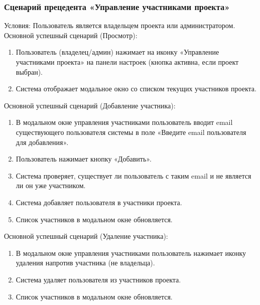 \subsubsection{Сценарий прецедента «Управление участниками проекта»}
Условия: Пользователь является владельцем проекта или администратором.
Основной успешный сценарий (Просмотр):
\begin{enumerate}
	\item Пользователь (владелец/админ) нажимает на иконку «Управление участниками проекта» на панели настроек (кнопка активна, если проект выбран).
	\item Система отображает модальное окно со списком текущих участников проекта.
\end{enumerate}
Основной успешный сценарий (Добавление участника):
\begin{enumerate}
	\item В модальном окне управления участниками пользователь вводит email существующего пользователя системы в поле «Введите email пользователя для добавления».
	\item Пользователь нажимает кнопку «Добавить».
	\item Система проверяет, существует ли пользователь с таким email и не является ли он уже участником.
	\item Система добавляет пользователя в участники проекта.
	\item Список участников в модальном окне обновляется.
\end{enumerate}
Основной успешный сценарий (Удаление участника):
\begin{enumerate}
	\item В модальном окне управления участниками пользователь нажимает иконку удаления напротив участника (не владельца).
	\item Система удаляет пользователя из участников проекта.
	\item Список участников в модальном окне обновляется.
\end{enumerate}

